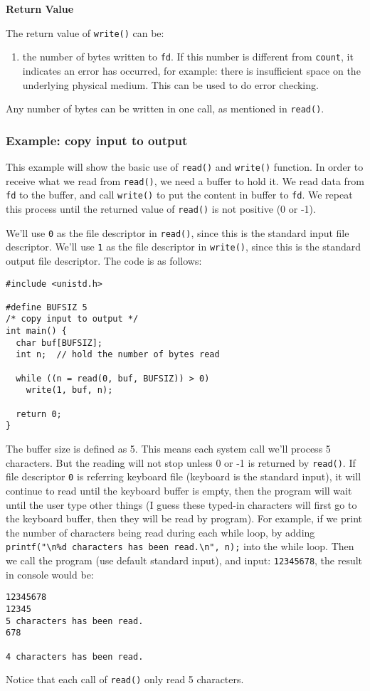 \documentclass[12pt]{article}
\begin{document}
\textbf{Return Value}

The return value of \texttt{write()} can be:
\begin{enumerate}
\item the number of bytes written to \texttt{fd}. If this number is different from \texttt{count}, it indicates an error has occurred, for example: there is insufficient space on the underlying physical medium. This can be used to do error checking.
\end{enumerate}

Any number of bytes can be written in one call, as mentioned in \texttt{read()}.
\subsubsection{Example: copy input to output}
\label{sec:org58c34a0}
This example will show the basic use of \texttt{read()} and \texttt{write()} function. In order to receive what we read from \texttt{read()}, we need a buffer to hold it. We read data from \texttt{fd} to the buffer, and call \texttt{write()} to put the content in buffer to \texttt{fd}. We repeat this process until the returned value of \texttt{read()} is not positive (0 or -1).

We'll use \texttt{0} as the file descriptor in \texttt{read()}, since this is the standard input file descriptor. We'll use \texttt{1} as the file descriptor in \texttt{write()}, since this is the standard output file descriptor. The code is as follows:
\begin{verbatim}
#include <unistd.h>

#define BUFSIZ 5
/* copy input to output */
int main() {
  char buf[BUFSIZ];
  int n;  // hold the number of bytes read

  while ((n = read(0, buf, BUFSIZ)) > 0)
    write(1, buf, n);

  return 0;
}
\end{verbatim}
The buffer size is defined as 5. This means each system call we'll process 5 characters. But the reading will not stop unless 0 or -1 is returned by \texttt{read()}. If file descriptor \texttt{0} is referring keyboard file (keyboard is the standard input), it will continue to read until the keyboard buffer is empty, then the program will wait until the user type other things (I guess these typed-in characters will first go to the keyboard buffer, then they will be read by program). For example, if we print the number of characters being read during each while loop, by adding \texttt{printf("\textbackslash{}n\%d characters has been read.\textbackslash{}n", n);} into the while loop. Then we call the program (use default standard input), and input: \texttt{12345678}, the result in console would be:
\begin{verbatim}
12345678
12345
5 characters has been read.
678

4 characters has been read.
\end{verbatim}
Notice that each call of \texttt{read()} only read 5 characters.
\end{document}
